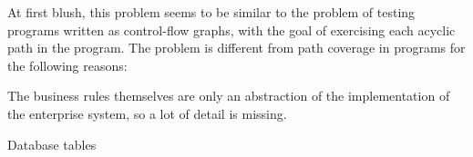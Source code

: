 
At first blush, this problem seems to be similar to the problem of testing
programs written as control-flow graphs, with the goal of exercising each acyclic path in the 
program.  The problem is different from path coverage in programs for the following reasons:

The business rules themselves are only an abstraction of the implementation of the enterprise system,
so a lot of detail is missing.

Database tables
